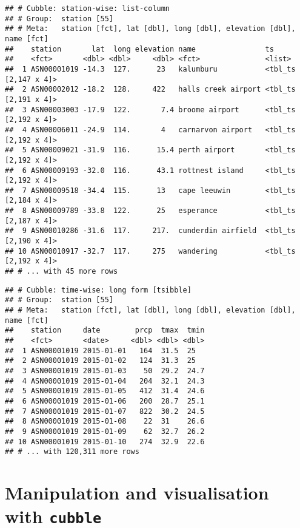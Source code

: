\documentclass{article}
\begin{document}
\begin{verbatim}
## # Cubble: station-wise: list-column
## # Group:  station [55]
## # Meta:   station [fct], lat [dbl], long [dbl], elevation [dbl], name [fct]
##    station       lat  long elevation name                ts                  
##    <fct>       <dbl> <dbl>     <dbl> <fct>               <list>              
##  1 ASN00001019 -14.3  127.      23   kalumburu           <tbl_ts [2,147 x 4]>
##  2 ASN00002012 -18.2  128.     422   halls creek airport <tbl_ts [2,191 x 4]>
##  3 ASN00003003 -17.9  122.       7.4 broome airport      <tbl_ts [2,192 x 4]>
##  4 ASN00006011 -24.9  114.       4   carnarvon airport   <tbl_ts [2,192 x 4]>
##  5 ASN00009021 -31.9  116.      15.4 perth airport       <tbl_ts [2,192 x 4]>
##  6 ASN00009193 -32.0  116.      43.1 rottnest island     <tbl_ts [2,192 x 4]>
##  7 ASN00009518 -34.4  115.      13   cape leeuwin        <tbl_ts [2,184 x 4]>
##  8 ASN00009789 -33.8  122.      25   esperance           <tbl_ts [2,187 x 4]>
##  9 ASN00010286 -31.6  117.     217.  cunderdin airfield  <tbl_ts [2,190 x 4]>
## 10 ASN00010917 -32.7  117.     275   wandering           <tbl_ts [2,192 x 4]>
## # ... with 45 more rows
\end{verbatim}

\begin{verbatim}
## # Cubble: time-wise: long form [tsibble]
## # Group:  station [55]
## # Meta:   station [fct], lat [dbl], long [dbl], elevation [dbl], name [fct]
##    station     date        prcp  tmax  tmin
##    <fct>       <date>     <dbl> <dbl> <dbl>
##  1 ASN00001019 2015-01-01   164  31.5  25  
##  2 ASN00001019 2015-01-02   124  31.3  25  
##  3 ASN00001019 2015-01-03    50  29.2  24.7
##  4 ASN00001019 2015-01-04   204  32.1  24.3
##  5 ASN00001019 2015-01-05   412  31.4  24.6
##  6 ASN00001019 2015-01-06   200  28.7  25.1
##  7 ASN00001019 2015-01-07   822  30.2  24.5
##  8 ASN00001019 2015-01-08    22  31    26.6
##  9 ASN00001019 2015-01-09    62  32.7  26.2
## 10 ASN00001019 2015-01-10   274  32.9  22.6
## # ... with 120,311 more rows
\end{verbatim}

\hypertarget{manipulation-and-visualisation-with-cubble}{%
\section{\texorpdfstring{Manipulation and visualisation with
\texttt{cubble}}{Manipulation and visualisation with cubble}}\label{manipulation-and-visualisation-with-cubble}}
\end{document}
